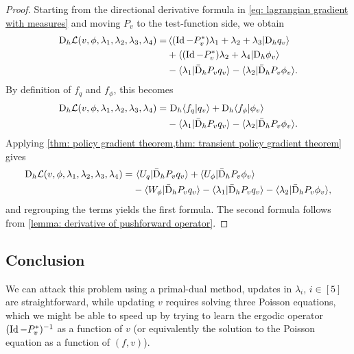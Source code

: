 \documentclass[twoside,10pt]{../jmlr}
\begin{document}
\begin{proof}
    Starting from the directional derivative formula in \eqref{eq: lagrangian gradient with measures} and moving $P_v$ to the test-function side, we obtain
    \begin{align}
        \mathrm{D}_h\mathcal{L}(v,\phi,\lambda_1,\lambda_2,\lambda_3,\lambda_4)
        =&\left\langle (\operatorname{Id}-P_v^*)\lambda_1+\lambda_2+\lambda_3\middle\vert \mathrm{D}_h q_v\right\rangle\notag\\
        &+\left\langle (\operatorname{Id}-P_v^*)\lambda_2+\lambda_4\middle\vert \mathrm{D}_h \phi_v\right\rangle\notag\\
        &-\langle \lambda_1\vert \bar{\mathrm{D}}_h P_v q_v\rangle-\langle \lambda_2\vert \bar{\mathrm{D}}_h P_v\phi_v\rangle.
    \end{align}
    By definition of $f_q$ and $f_\phi$, this becomes
    \begin{align}
        \mathrm{D}_h\mathcal{L}(v,\phi,\lambda_1,\lambda_2,\lambda_3,\lambda_4)
        =&\ \mathrm{D}_h\langle f_q\vert q_v\rangle+\mathrm{D}_h\langle f_\phi\vert \phi_v\rangle\notag\\
        &-\langle \lambda_1\vert \bar{\mathrm{D}}_h P_v q_v\rangle-\langle \lambda_2\vert \bar{\mathrm{D}}_h P_v\phi_v\rangle.
    \end{align}
    Applying \cref{thm: policy gradient theorem,thm: transient policy gradient theorem} gives
    \begin{align}
        \mathrm{D}_h\mathcal{L}(v,\phi,\lambda_1,\lambda_2,\lambda_3,\lambda_4)
        =&\ \langle U_q\vert \bar{\mathrm{D}}_h P_v q_v\rangle+\langle U_\phi\vert \bar{\mathrm{D}}_h P_v\phi_v\rangle\notag\\
        &-\langle W_\phi\vert \bar{\mathrm{D}}_h P_v q_v\rangle-\langle \lambda_1\vert \bar{\mathrm{D}}_h P_v q_v\rangle-\langle \lambda_2\vert \bar{\mathrm{D}}_h P_v\phi_v\rangle,
    \end{align}
    and regrouping the terms yields the first formula. The second formula follows from \cref{lemma: derivative of pushforward operator}.
\end{proof}


\subsection{Conclusion}

We can attack this problem using a primal-dual method, updates in $\lambda_i$, $i\in[5]$ are straightforward, while updating $v$ requires solving three Poisson equations, which we might be able to speed up by trying to learn the ergodic operator $(\operatorname{Id}-P^*_v)^{-1}$ as a function of $v$ (or equivalently the solution to the Poisson equation as a function of $(f,v)$).
\end{document}
